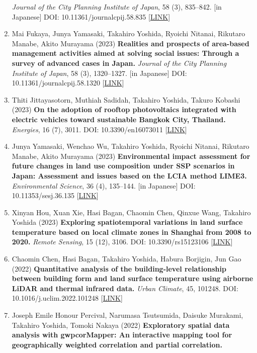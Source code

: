 \documentclass[
]{book}
\begin{document}
\begin{enumerate}
  \emph{Journal of the City Planning Institute of Japan}, 58 (3), 835--842. {[}in Japanese{]}
  DOI: 10.11361/journalcpij.58.835 {[}\href{https://doi.org/10.11361/journalcpij.58.835}{LINK}{]}
\item
  Mai Fukaya, Junya Yamasaki, Takahiro Yoshida, Ryoichi Nitanai, Rikutaro Manabe, Akito Murayama (2023)
  \textbf{Realities and prospects of area-based management activities aimed at solving social issues: Through a survey of advanced cases in Japan.}
  \emph{Journal of the City Planning Institute of Japan}, 58 (3), 1320--1327. {[}in Japanese{]}
  DOI: 10.11361/journalcpij.58.1320 {[}\href{https://doi.org/10.11361/journalcpij.58.1320}{LINK}{]}
\item
  Thiti Jittayasotorn, Muthiah Sadidah, Takahiro Yoshida, Takuro Kobashi (2023)
  \textbf{On the adoption of rooftop photovoltaics integrated with electric vehicles toward sustainable Bangkok City, Thailand.}
  \emph{Energies}, 16 (7), 3011.
  DOI: 10.3390/en16073011 {[}\href{https://www.mdpi.com/1996-1073/16/7/3011}{LINK}{]}
\item
  Junya Yamasaki, Wenchao Wu, Takahiro Yoshida, Ryoichi Nitanai, Rikutaro Manabe, Akito Murayama (2023)
  \textbf{Environmental impact assessment for future changes in land use composition under SSP scenarios in Japan: Assessment and issues based on the LCIA method LIME3.}
  \emph{Environmental Science}, 36 (4), 135--144. {[}in Japanese{]}
  DOI: 10.11353/sesj.36.135 {[}\href{https://doi.org/10.11353/sesj.36.135}{LINK}{]}
\item
  Xinyan Hou, Xuan Xie, Hasi Bagan, Chaomin Chen, Qinxue Wang,
  Takahiro Yoshida (2023)
  \textbf{Exploring spatiotemporal variations in land surface temperature based on local climate zones in Shanghai from 2008 to 2020.}
  \emph{Remote Sensing}, 15 (12), 3106.
  DOI: 10.3390/rs15123106 {[}\href{https://www.mdpi.com/2072-4292/15/12/3106}{LINK}{]}
\item
  Chaomin Chen, Hasi Bagan, Takahiro Yoshida, Habura Borjigin, Jun Gao (2022)
  \textbf{Quantitative analysis of the building-level relationship between building form and land surface temperature using airborne LiDAR and thermal infrared data.}
  \emph{Urban Climate}, 45, 101248.
  DOI: 10.1016/j.uclim.2022.101248 {[}\href{https://doi.org/10.1016/j.uclim.2022.101248}{LINK}{]}
\item
  Joseph Emile Honour Percival, Narumasa Tsutsumida, Daisuke Murakami, Takahiro Yoshida, Tomoki Nakaya (2022)
  \textbf{Exploratory spatial data analysis with gwpcorMapper: An interactive mapping tool for geographically weighted correlation and partial correlation.}

\end{enumerate}
\end{document}

